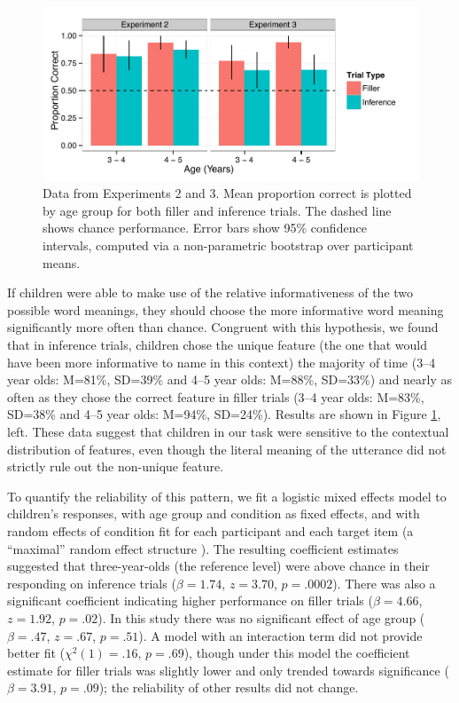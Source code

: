 \documentclass[review]{elsarticle}
\begin{document}
\begin{figure}
\begin{center}
\includegraphics[width=5in]{e2-3_barplot.pdf}
\caption{\label{fig:kids} Data from Experiments 2 and 3. Mean proportion correct is plotted by age group for both filler and inference trials. The dashed line shows chance performance. Error bars show 95\% confidence intervals, computed via a non-parametric bootstrap over participant means. }
\end{center}
\end{figure}

If children were able to make use of the relative informativeness of the two possible word meanings, they should choose the more informative word meaning significantly more often than chance. Congruent with this hypothesis, we found that in inference trials, children chose the unique feature (the one that would have been more informative to name in this context) the majority of time (3--4 year olds: M=81\%, SD=39\% and 4--5 year olds: M=88\%, SD=33\%) and nearly as often as they chose the correct feature in filler trials (3--4 year olds: M=83\%, SD=38\% and 4--5 year olds: M=94\%, SD=24\%). Results are shown in Figure \ref{fig:kids}, left. These data suggest that children in our task were sensitive to the contextual distribution of features, even though the literal meaning of the utterance did not strictly rule out the non-unique feature.

To quantify the reliability of this pattern, we fit a logistic mixed effects model \citep{gelman2006,jaeger2008} to children's responses, with age group and condition as fixed effects, and with random effects of condition fit for each participant and each target item (a ``maximal'' random effect structure \citealp{barr2013}).  The resulting coefficient estimates suggested that three-year-olds (the reference level) were above chance in their responding on inference trials ($\beta = 1.74$, $z = 3.70$, $p = .0002$). There was also a significant coefficient indicating higher performance on filler trials ($\beta = 4.66$, $z=1.92$, $p = .02$). In this study there was no significant effect of age group ($\beta = .47$, $z = .67$, $p = .51$). A model with an interaction term did not provide better fit ($\chi^2(1) = .16$, $p = .69$), though under this model the coefficient estimate for filler trials was slightly lower and only trended towards significance ($\beta = 3.91$, $p = .09$); the reliability of other results did not change. 
\end{document}
